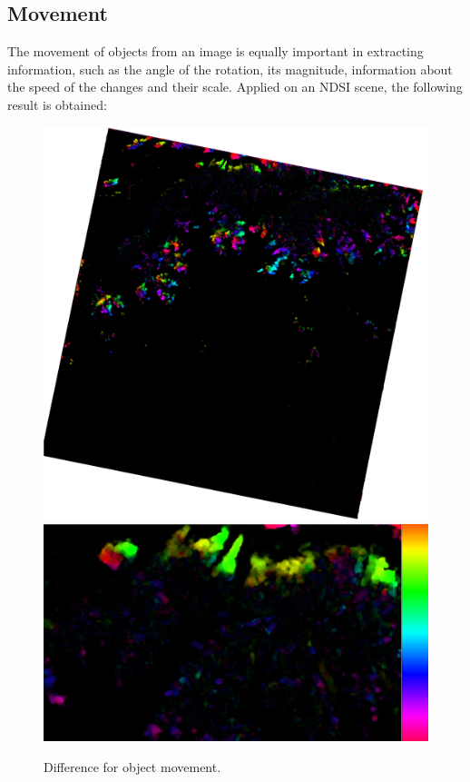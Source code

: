 \documentclass[12pt, a4paper]{report}
\begin{document}
  	\subsection{Movement}
  	The movement of objects from an image is equally important in extracting information, such as the angle of the rotation, its magnitude, information about the speed of the changes and their scale. Applied on an NDSI scene, the following result is obtained:
  	\begin{figure}[H]
  		\includegraphics[width=\linewidth]{move_big.png}
  		\endminipage\hfill
  		\includegraphics[width=\linewidth]{move_tiny.png}
  		\endminipage\hfill
  		\caption{Difference for object movement.}\label{fig:move_img}
  	\end{figure}
	
\end{document}
